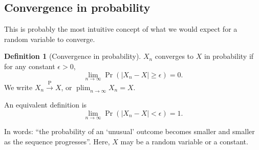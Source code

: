 \documentclass[
]{book}
\DeclareMathOperator*{\plim}{plim}
\theoremstyle{definition}
\newtheorem{definition}{Definition}[chapter]
\theoremstyle{definition}
\theoremstyle{definition}
\theoremstyle{definition}
\theoremstyle{remark}
\begin{document}
\hypertarget{convergence-in-probability}{%
\subsection{Convergence in probability}\label{convergence-in-probability}}

This is probably the most intuitive concept of what we would expect for a random variable to converge.

\begin{definition}[Convergence in probability]
\(X_n\) converges to \(X\) in probability if for any constant \(\epsilon>0\),
\[\lim_{n\to\infty} \Pr(|X_n-X|\geq\epsilon) = 0.\]
We write
\(X_n\xrightarrow{\text{P}}X\), or \(\plim_{n\to\infty}X_n = X\).
\end{definition}

An equivalent definition is
\[
  \lim_{n\to\infty}\Pr(|X_n-X| < \epsilon)  = 1.
\]

In words: ``the probability of an `unusual' outcome becomes smaller and smaller as the sequence progresses''.
Here, \(X\) may be a random variable or a constant.
\end{document}
